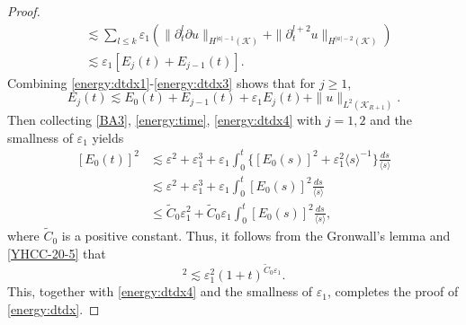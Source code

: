 \documentclass[11pt,twoside]{article}
\def\cK{\mathcal K}
\def\p{\partial}
\def\ve{\varepsilon}
\def\ls{\lesssim}
\newcommand{\w}[1]{\langle {#1} \rangle}
\theoremstyle{plain}
\theoremstyle{definition}
\numberwithin{equation}{section}
\begin{document}
\begin{proof}
\begin{equation}
\begin{split}
&\ls\sum_{l\le k}\ve_1(\|\p_t^l\p u\|_{H^{|a|-1}(\cK)}+\|\p_t^{l+2}u\|_{H^{|a|-2}(\cK)})\\
&\ls\ve_1[E_j(t)+E_{j-1}(t)].
\end{split}
\end{equation}
Combining \eqref{energy:dtdx1}-\eqref{energy:dtdx3} shows that for $j\ge1$,
\begin{equation}\label{energy:dtdx4}
E_j(t)\ls E_0(t)+E_{j-1}(t)+\ve_1E_j(t)+\|u\|_{L^2(\cK_{R+1})}.
\end{equation}
Then collecting \eqref{BA3}, \eqref{energy:time}, \eqref{energy:dtdx4} with $j=1,2$ and the smallness of $\ve_1$ yields
\begin{equation}\label{YHCC-20-5}
\begin{split}
[E_0(t)]^2&\ls\ve^2+\ve_1^3+\ve_1\int_0^t\big\{[E_0(s)]^2+\ve_1^2\w{s}^{-1}\big\}\frac{ds}{\w{s}}\\
&\ls\ve^2+\ve_1^3+\ve_1\int_0^t[E_0(s)]^2\frac{ds}{\w{s}}\\
&\le\tilde C_0\ve_1^2+\tilde C_0\ve_1\int_0^t[E_0(s)]^2\frac{ds}{\w{s}},
\end{split}
\end{equation}
where $\tilde C_0$ is a positive constant.
Thus, it follows from the Gronwall's lemma and \eqref{YHCC-20-5} that
\begin{equation*}
[E_0(t)]^2\ls\ve_1^2(1+t)^{\tilde C_0\ve_1}.
\end{equation*}
This, together with \eqref{energy:dtdx4} and the smallness of $\ve_1$, completes the proof of \eqref{energy:dtdx}.
\end{proof}
\end{document}
